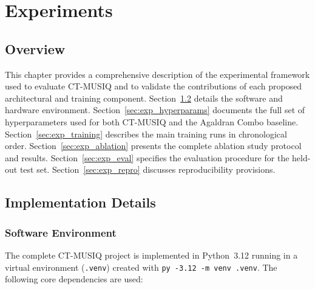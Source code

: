 
\chapter{Experiments}
\label{chap:experiments}

\section{Overview}
\label{sec:exp_overview}

This chapter provides a comprehensive description of the experimental framework used to
evaluate CT-MUSIQ and to validate the contributions of each proposed architectural and
training component. Section~\ref{sec:exp_impl} details the software and hardware
environment. Section~\ref{sec:exp_hyperparams} documents the full set of hyperparameters
used for both CT-MUSIQ and the Agaldran Combo baseline. Section~\ref{sec:exp_training}
describes the main training runs in chronological order. Section~\ref{sec:exp_ablation}
presents the complete ablation study protocol and results. Section~\ref{sec:exp_eval}
specifies the evaluation procedure for the held-out test set. Section~\ref{sec:exp_repro}
discusses reproducibility provisions.


\section{Implementation Details}
\label{sec:exp_impl}

\subsection{Software Environment}

The complete CT-MUSIQ project is implemented in Python~3.12 running in a virtual
environment (\texttt{.venv}) created with \texttt{py -3.12 -m venv .venv}. The following
core dependencies are used:

